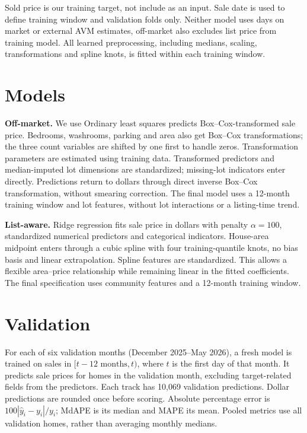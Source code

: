 \documentclass[11pt]{article}
\begin{document}
Sold price is our training target, not include as an input. Sale date is used to define training window and validation folds only. Neither model uses days on market or external AVM estimates, off-market also excludes list price from training model. All learned preprocessing, including medians, scaling, transformations and spline knots, is fitted within each training window.


\section{Models}


\textbf{Off-market.} We use Ordinary least squares predicts Box--Cox-transformed sale price. Bedrooms, washrooms, parking and area also get Box--Cox transformations; the three count variables are shifted by one first to handle zeros. Transformation parameters are estimated using training data. Transformed predictors and median-imputed lot dimensions are standardized; missing-lot indicators enter directly. Predictions return to dollars through direct inverse Box--Cox transformation, without smearing correction. The final model uses a 12-month training window and lot features, without lot interactions or a listing-time trend.

\textbf{List-aware.} Ridge regression fits sale price in dollars with penalty $\alpha=100$, standardized numerical predictors and categorical indicators. House-area midpoint enters through a cubic spline with four training-quantile knots, no bias basis and linear extrapolation. Spline features are standardized. This allows a flexible area--price relationship while remaining linear in the fitted coefficients. The final specification uses community features and a 12-month training window.


\section{Validation}
For each of six validation months (December 2025--May 2026), a fresh model is trained on sales in $[t-12\text{ months},t)$, where $t$ is the first day of that month. It predicts sale prices for homes in the validation month, excluding target-related fields from the predictors. Each track has 10,069 validation predictions. Dollar predictions are rounded once before scoring. Absolute percentage error is $100|\hat y_i-y_i|/y_i$; MdAPE is its median and MAPE its mean. Pooled metrics use all validation homes, rather than averaging monthly medians.
\end{document}
